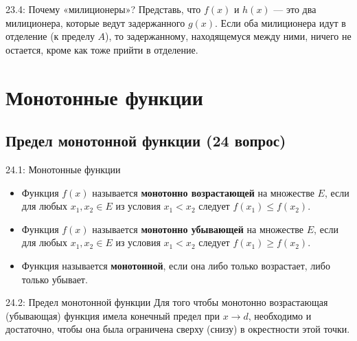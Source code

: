 \documentclass[a4paper,12pt]{article}
\begin{document}
	\begin{notebook}{23.4: Почему «милиционеры»?}
		Представь, что $f(x)$ и $h(x)$ — это два милиционера, которые ведут задержанного $g(x)$. Если оба милиционера идут в отделение (к пределу $A$), то задержанному, находящемуся между ними, ничего не остается, кроме как тоже прийти в отделение.
	\end{notebook}
	
	
	
	
	
	\newpage
	\section{Монотонные функции}
	
	\subsection{Предел монотонной функции (24 вопрос)}
	
	\begin{definitionbox}{24.1: Монотонные функции}
		\begin{itemize}
			\item Функция $f(x)$ называется \textbf{монотонно возрастающей} на множестве $E$, если для любых $x_1, x_2 \in E$ из условия $x_1 < x_2$ следует $f(x_1) \le f(x_2)$.
			\item Функция $f(x)$ называется \textbf{монотонно убывающей} на множестве $E$, если для любых $x_1, x_2 \in E$ из условия $x_1 < x_2$ следует $f(x_1) \ge f(x_2)$.
			\item Функция называется \textbf{монотонной}, если она либо только возрастает, либо только убывает.
		\end{itemize}
	\end{definitionbox}
	
	\begin{center}
	\end{center}
	
	\begin{theorembox}{24.2: Предел монотонной функции}
		Для того чтобы монотонно возрастающая (убывающая) функция имела конечный предел при $x \to d$, необходимо и достаточно, чтобы она была ограничена сверху (снизу) в окрестности этой точки.
	\end{theorembox}
	
\end{document}
